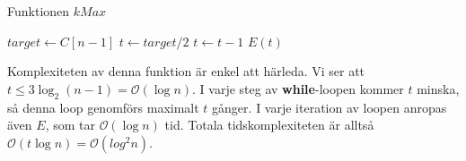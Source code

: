 \documentclass[a4paper,titlepage]{article}
\renewcommand{\O}{\mathcal {O}}
\theoremstyle{definition}
\begin{document}
    \begin{algorithm}[H]
        \caption{Funktionen $kMax$}
        \begin{algorithmic}[1]
               \State $target \gets C[n-1] $
               \State $t \gets target/2 $
                \State $t \gets t-1$
                \EndWhile
                \State \Return $E(t)$
            \EndProcedure
        \end{algorithmic}
    \end{algorithm}
    
    Komplexiteten av denna funktion är enkel att härleda.
    Vi ser att $t\le3\log_2(n-1) = \O(\log n)$. I varje steg av
    \textbf{while}-loopen kommer $t$ minska, så denna loop genomförs maximalt
    $t$ gånger. I varje iteration av loopen anropas även $E$, som tar $\O(\log n)$
    tid. Totala tidskomplexiteten är alltså $\O(t\log n) = \O(log^2 n)$.
\end{document}
